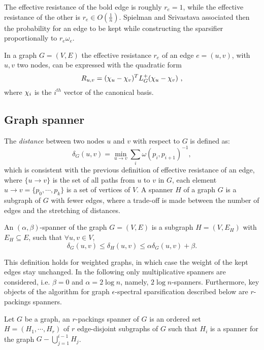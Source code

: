 The effective resistance of the bold edge is roughly $r_e = 1$, while the
effective resistance of the other is $r_e \in O(\frac{1}{n})$. Spielman and
Srivastava associated then the probability for an edge to be kept while
constructing the sparsifier proportionally to $r_e \omega_e$.

In a graph $G=(V,E)$ the effective resistance $r_e$ of an edge $e=(u,v)$, with $u,v$ two nodes, 
can be expressed with the quadratic form
\begin{equation}\label{eq:effective-resistance}
   R_{u,v} = (\chi_u - \chi_v)^TL_G^+(\chi_u - \chi_v) \text{ ,}
\end{equation}
where $\chi_i$ is the $i^{th}$ vector of the canonical basis. \cite{spielman_graph_2011}


\subsection{Graph spanner}
The \textit{distance} between two nodes $u$ and $v$ with respect to $G$ is
defined as:
\begin{equation*}
    \delta_G(u,v) = \min_{u\rightarrow v} \sum_{i} \omega(p_{i}, p_{i+1})^{-1},
\end{equation*}
which is consistent with the previous definition of effective resistance of an
edge, where $\{ u\rightarrow v\}$ is the set of all paths from $u$ to $v$ in
$G$, each element $u\rightarrow v = \{p_0, \cdots, p_k\}$ is a set of vertices
of $V$. A spanner $H$ of a graph $G$ is a subgraph of $G$ with fewer edges,
where a trade-off is made between the number of edges and the stretching of
distances.
\begin{definition}
    An $(\alpha,\beta)$-spanner of the graph $G=(V,E)$ is a subgraph $H = (V,
    E_H)$ with $E_H \subseteq E$, such that $\forall u, v \in V$,
    \begin{equation*}
        \delta_G(u,v) \leq \delta_H(u,v) \leq \alpha\delta_G(u,v) + \beta.
    \end{equation*}
\end{definition}
This definition holds for weighted graphs, in which case the weight of the kept
edges stay unchanged. In the following only multiplicative spanners are
considered, i.e. $\beta = 0$ and $\alpha = 2 \log n$, namely, $2\log
n$-spanners. Furthermore, key objects of the algorithm for graph
$\epsilon$-spectral sparsification described below are $r$-packings spanners.
\begin{definition}\label{def:packing-spanner}
    Let $G$ be a graph, an $r$-packings spanner of $G$ is an ordered set $H=(H_1,
    \cdots, H_r)$ of $r$ edge-disjoint subgraphs of $G$ such that $H_i$ is a
    spanner for the graph $G - \bigcup_{j=1}^{i-1} H_j$.
\end{definition}

